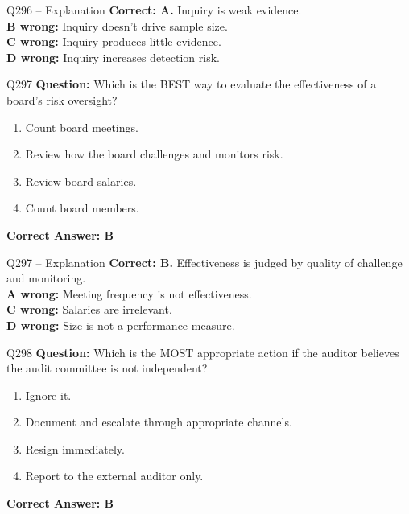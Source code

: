 \documentclass[aspectratio=169,10pt]{beamer}
\begin{document}
	\begin{frame}[t]{Q296 -- Explanation}
		\small
		\textbf{Correct: A.} Inquiry is weak evidence. \\[4pt]
		\textbf{B wrong:} Inquiry doesn't drive sample size. \\[2pt]
		\textbf{C wrong:} Inquiry produces little evidence. \\[2pt]
		\textbf{D wrong:} Inquiry increases detection risk.
	\end{frame}
	
	\begin{frame}[t]{Q297}
		\small
		\textbf{Question:} Which is the BEST way to evaluate the effectiveness of a board's risk oversight?
		\begin{enumerate}[label=\Alph*.,itemsep=1pt,topsep=2pt]
			\item Count board meetings.
			\item Review how the board challenges and monitors risk.
			\item Review board salaries.
			\item Count board members.
		\end{enumerate}
		\vspace{4pt}
		\textbf{Correct Answer: B}
	\end{frame}
	
	\begin{frame}[t]{Q297 -- Explanation}
		\small
		\textbf{Correct: B.} Effectiveness is judged by quality of challenge and monitoring. \\[4pt]
		\textbf{A wrong:} Meeting frequency is not effectiveness. \\[2pt]
		\textbf{C wrong:} Salaries are irrelevant. \\[2pt]
		\textbf{D wrong:} Size is not a performance measure.
	\end{frame}
	
	\begin{frame}[t]{Q298}
		\small
		\textbf{Question:} Which is the MOST appropriate action if the auditor believes the audit committee is not independent?
		\begin{enumerate}[label=\Alph*.,itemsep=1pt,topsep=2pt]
			\item Ignore it.
			\item Document and escalate through appropriate channels.
			\item Resign immediately.
			\item Report to the external auditor only.
		\end{enumerate}
		\vspace{4pt}
		\textbf{Correct Answer: B}
	\end{frame}
	
\end{document}
